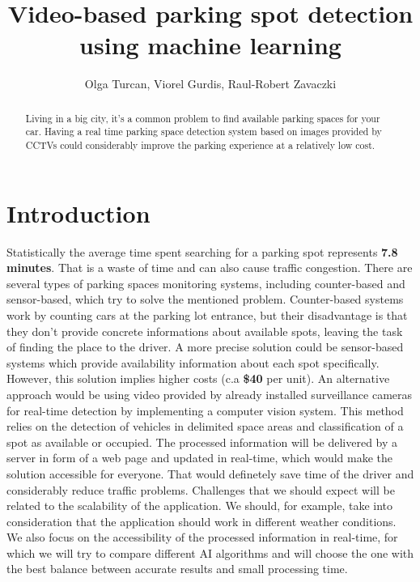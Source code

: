 \documentclass[12pt]{article}
\title{Video-based parking spot detection using machine learning}
\author{Olga Turcan, Viorel Gurdis, Raul-Robert Zavaczki}
\begin{document}
 

\maketitle

\begin{abstract}
  Living in a big city, it's a common problem to find available parking 
  spaces for your car. Having a real time parking space 
  detection system based on images provided by CCTVs could considerably 
  improve the parking experience at a relatively low cost.
\end{abstract}

\section{Introduction}

Statistically the average time spent searching for a parking spot represents \textbf{7.8 minutes}.
That is a waste of time and can also cause traffic congestion. There are several types of 
parking spaces monitoring systems, including counter-based and sensor-based, which try to solve the mentioned problem.
Counter-based systems work by counting cars at the parking lot entrance, but their disadvantage is that they don't provide 
concrete informations about available spots, leaving the task of finding the place to the driver.
A more precise solution could be sensor-based systems which provide availability information about each 
spot specifically. However, this solution implies higher costs (c.a \textbf{\$40} per unit). 
An alternative approach would be using video provided by already installed surveillance cameras for real-time 
detection by implementing a computer vision system.
This method relies on the detection of vehicles in delimited space areas and classification of a spot as 
available or occupied. The processed information will be delivered by a server in form of a web page and updated 
in real-time, which would make the solution accessible for everyone. That would definetely save time of the driver 
and considerably reduce traffic problems.
Challenges that we should expect will be related to the scalability of the application. We should, for example, take into 
consideration that the application should work in different weather conditions. We also focus on the accessibility 
of the processed information in real-time, for which we will try to compare different AI algorithms and will choose 
the one with the best balance between accurate results and small processing time.
\end{document}
